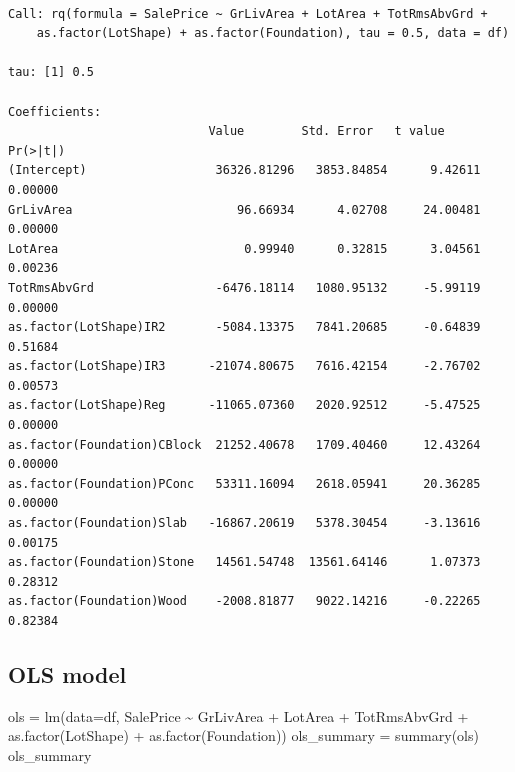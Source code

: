 \documentclass[
  letterpaper,
  DIV=11,
  numbers=noendperiod]{scrreprt}
\newenvironment{Shaded}{\begin{snugshade}}{\end{snugshade}}
\newcommand{\AttributeTok}[1]{\textcolor[rgb]{0.40,0.45,0.13}{#1}}
\newcommand{\FunctionTok}[1]{\textcolor[rgb]{0.28,0.35,0.67}{#1}}
\newcommand{\NormalTok}[1]{\textcolor[rgb]{0.00,0.23,0.31}{#1}}
\newcommand{\OtherTok}[1]{\textcolor[rgb]{0.00,0.23,0.31}{#1}}
\newcommand{\SpecialCharTok}[1]{\textcolor[rgb]{0.37,0.37,0.37}{#1}}
\begin{document}
\begin{verbatim}

Call: rq(formula = SalePrice ~ GrLivArea + LotArea + TotRmsAbvGrd + 
    as.factor(LotShape) + as.factor(Foundation), tau = 0.5, data = df)

tau: [1] 0.5

Coefficients:
                            Value        Std. Error   t value      Pr(>|t|)    
(Intercept)                  36326.81296   3853.84854      9.42611      0.00000
GrLivArea                       96.66934      4.02708     24.00481      0.00000
LotArea                          0.99940      0.32815      3.04561      0.00236
TotRmsAbvGrd                 -6476.18114   1080.95132     -5.99119      0.00000
as.factor(LotShape)IR2       -5084.13375   7841.20685     -0.64839      0.51684
as.factor(LotShape)IR3      -21074.80675   7616.42154     -2.76702      0.00573
as.factor(LotShape)Reg      -11065.07360   2020.92512     -5.47525      0.00000
as.factor(Foundation)CBlock  21252.40678   1709.40460     12.43264      0.00000
as.factor(Foundation)PConc   53311.16094   2618.05941     20.36285      0.00000
as.factor(Foundation)Slab   -16867.20619   5378.30454     -3.13616      0.00175
as.factor(Foundation)Stone   14561.54748  13561.64146      1.07373      0.28312
as.factor(Foundation)Wood    -2008.81877   9022.14216     -0.22265      0.82384
\end{verbatim}

\hypertarget{ols-model}{%
\subsection{OLS model}\label{ols-model}}

\begin{Shaded}
\begin{Highlighting}[]
\NormalTok{ols }\OtherTok{=} \FunctionTok{lm}\NormalTok{(}\AttributeTok{data=}\NormalTok{df, SalePrice }\SpecialCharTok{\textasciitilde{}}\NormalTok{ GrLivArea }\SpecialCharTok{+}\NormalTok{ LotArea }\SpecialCharTok{+}\NormalTok{ TotRmsAbvGrd }\SpecialCharTok{+} \FunctionTok{as.factor}\NormalTok{(LotShape) }\SpecialCharTok{+} \FunctionTok{as.factor}\NormalTok{(Foundation))}
\NormalTok{ols\_summary }\OtherTok{=} \FunctionTok{summary}\NormalTok{(ols)}
\NormalTok{ols\_summary}
\end{Highlighting}
\end{Shaded}
\end{document}
